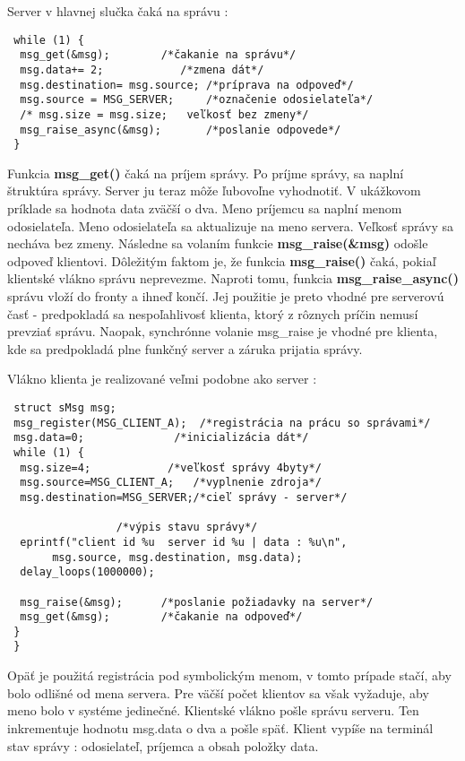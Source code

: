Server v hlavnej slučka čaká na správu :
{\small
\begin{verbatim}
 while (1) {
  msg_get(&msg);		/*čakanie na správu*/
  msg.data+= 2;		       /*zmena dát*/
  msg.destination= msg.source; /*príprava na odpoveď*/
  msg.source = MSG_SERVER;     /*označenie odosielateľa*/
  /* msg.size = msg.size;	veľkosť bez zmeny*/
  msg_raise_async(&msg);       /*poslanie odpovede*/
 }
\end{verbatim}
}

Funkcia \textbf{msg\_get()} čaká na príjem správy. Po príjme správy, sa naplní štruktúra správy. Server ju teraz môže ľubovoľne vyhodnotiť. V ukážkovom príklade sa hodnota data zväčší o dva. Meno príjemcu sa naplní menom odosielateľa. Meno odosielateľa sa aktualizuje na meno servera. Veľkosť správy sa necháva bez zmeny. Následne sa volaním funkcie \textbf{msg\_raise(\&msg)} odošle odpoveď klientovi.
Dôležitým faktom je, že funkcia \textbf{msg\_raise()} čaká, pokiaľ klientské vlákno správu neprevezme. Naproti tomu, funkcia \textbf{msg\_raise\_async()} správu vloží do fronty a ihneď končí. Jej použitie je preto vhodné pre serverovú časť - predpokladá sa nespoľahlivosť klienta, ktorý z rôznych príčin nemusí prevziať správu. Naopak, synchrónne volanie msg\_raise je vhodné pre klienta, kde sa predpokladá plne funkčný server a záruka prijatia správy.

Vlákno klienta je realizované veľmi podobne ako server :
{\small
\begin{verbatim}
 struct sMsg msg;
 msg_register(MSG_CLIENT_A);  /*registrácia na prácu so správami*/
 msg.data=0;		      /*inicializácia dát*/	
 while (1) {
  msg.size=4;		     /*veľkosť správy 4byty*/
  msg.source=MSG_CLIENT_A;   /*vyplnenie zdroja*/
  msg.destination=MSG_SERVER;/*cieľ správy - server*/

			     /*výpis stavu správy*/
  eprintf("client id %u  server id %u | data : %u\n", 
	   msg.source, msg.destination, msg.data);
  delay_loops(1000000);
	 
  msg_raise(&msg); 	    /*poslanie požiadavky na server*/
  msg_get(&msg); 	    /*čakanie na odpoveď*/
 }
 }
\end{verbatim}
}

Opäť je použitá registrácia pod symbolickým menom, v tomto prípade stačí, aby bolo odlišné od mena servera. Pre väčší počet klientov sa však vyžaduje, aby meno bolo v systéme jedinečné. Klientské vlákno pošle správu serveru. Ten inkrementuje hodnotu msg.data o dva a pošle späť. Klient vypíše na terminál stav správy : odosielateľ, príjemca a obsah položky data.

